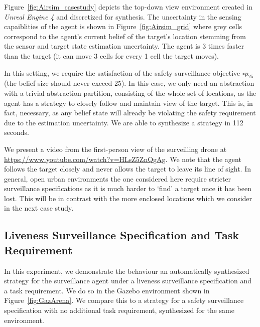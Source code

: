 Figure~\ref{fig:Airsim_casestudy} depicts the top-down view environment created in \emph{Unreal Engine 4} and discretized for synthesis. The uncertainty in the sensing capaiblities of the agent is shown in Figure~\ref{fig:Airsim_grid} where grey cells correspond to the agent's current belief of the target's location stemming from the sensor and target state estimation uncertainty. The agent is 3 times faster than the target (it can move 3 cells for every 1 cell the target moves). 

In this setting, we require the satisfaction of the safety surveillance objective $\square p_{25}$ (the belief size should never exceed 25). In this case, we only need an abstraction with a trivial abstraction partition, consisting of the whole set of locations, as the agent has a strategy to closely follow and maintain view of the target. This is, in fact, necessary, as
any belief state will already be violating the safety requirement due to the estimation uncertainty. We are able to synthesize a strategy in 112 seconds. 
 
We present a video from the first-person view of the surveilling drone at \url{https://www.youtube.com/watch?v=HLsZ5ZnQgAg}. We note that the agent follows the target closely and never allows the target to leave its line of sight. In general, open urban environments the one considered here require stricter surveillance specifications as it is much harder to `find' a target once it has been lost. This will be in contrast with the more enclosed locations which we consider in the next case study.




\subsection{Liveness Surveillance Specification and Task Requirement} 
In this experiment, we demonstrate the behaviour an automatically synthesized strategy for the surveillance agent under a liveness surveillance specification and a task requirement. We do so in the Gazebo environment shown in Figure~\ref{fig:GazArena}. We compare this to a strategy for a safety surveillance specification with no additional task requirement, synthesized for the same environment. 



